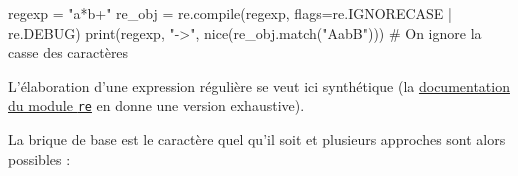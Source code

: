 \begin{idleconsole*}
	\begin{pyconsole}
regexp = "a*b+"
re_obj = re.compile(regexp, flags=re.IGNORECASE | re.DEBUG)
print(regexp, "->", nice(re_obj.match("AabB"))) # On ignore la casse des caractères
	\end{pyconsole}
\end{idleconsole*}

\vspace{1pt}


L'élaboration d'une expression régulière se veut ici synthétique (la \href{https://docs.python.org/3/library/re.html}{documentation du module \texttt{re}} en donne une version exhaustive).

La brique de base est le caractère quel qu'il soit et plusieurs approches sont alors possibles :
